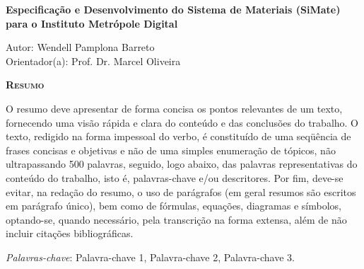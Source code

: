 \begin{center}
	{\Large{\textbf{Especificação e Desenvolvimento do Sistema de Materiais (SiMate) para o Instituto Metrópole Digital}}}
\end{center}

\vspace{1cm}

\begin{flushright}
	Autor: Wendell Pamplona Barreto\\
	Orientador(a): Prof. Dr. Marcel Oliveira
\end{flushright}

\vspace{1cm}

\begin{center}
	\Large{\textsc{\textbf{Resumo}}}
\end{center}

\noindent O resumo deve apresentar de forma concisa os pontos relevantes de um texto, fornecendo uma visão rápida e clara do conteúdo e das conclusões do trabalho. O texto, redigido na forma impessoal do verbo, é constituído de uma seqüência de frases concisas e objetivas e não de uma simples enumeração de tópicos, não ultrapassando 500 palavras, seguido, logo abaixo, das palavras representativas do conteúdo do trabalho, isto é, palavras-chave e/ou descritores. Por fim, deve-se evitar, na redação do resumo, o uso de parágrafos (em geral resumos são escritos em parágrafo único), bem como de fórmulas, equações, diagramas e símbolos, optando-se, quando necessário, pela transcrição na forma extensa, além de não incluir citações bibliográficas.

\noindent\textit{Palavras-chave}: Palavra-chave 1, Palavra-chave 2, Palavra-chave 3.